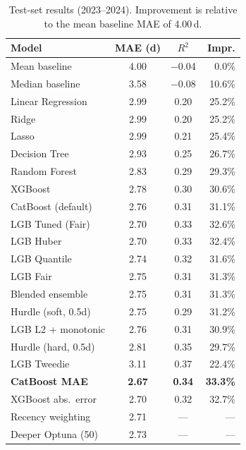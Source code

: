 \documentclass[sigconf,nonacm]{acmart}
\begin{document}
\begin{table}[t]
\caption{Test-set results (2023--2024). Improvement is relative
to the mean baseline MAE of 4.00\,d.}
\label{tab:results}
\centering
\small
\begin{tabular}{lccr}
\toprule
\textbf{Model} & \textbf{MAE (d)} & \textbf{$R^2$} &
  \textbf{Impr.} \\
\midrule
Mean baseline         & 4.00 & $-$0.04 &  0.0\% \\
Median baseline       & 3.58 & $-$0.08 & 10.6\% \\
\midrule
Linear Regression     & 2.99 &   0.20  & 25.2\% \\
Ridge                 & 2.99 &   0.20  & 25.2\% \\
Lasso                 & 2.99 &   0.21  & 25.4\% \\
Decision Tree         & 2.93 &   0.25  & 26.7\% \\
\midrule
Random Forest         & 2.83 &   0.29  & 29.3\% \\
XGBoost               & 2.78 &   0.30  & 30.6\% \\
CatBoost (default)    & 2.76 &   0.31  & 31.1\% \\
\midrule
LGB Tuned (Fair)      & 2.70 &   0.33  & 32.6\% \\
LGB Huber             & 2.70 &   0.33  & 32.4\% \\
LGB Quantile          & 2.74 &   0.32  & 31.6\% \\
LGB Fair              & 2.75 &   0.31  & 31.3\% \\
Blended ensemble      & 2.75 &   0.31  & 31.3\% \\
Hurdle (soft, 0.5d)   & 2.75 &   0.29  & 31.2\% \\
LGB L2 + monotonic    & 2.76 &   0.31  & 30.9\% \\
Hurdle (hard, 0.5d)   & 2.81 &   0.35  & 29.7\% \\
LGB Tweedie           & 3.11 &   0.37  & 22.4\% \\
\midrule
\textbf{CatBoost MAE} & \textbf{2.67} & \textbf{0.34} &
  \textbf{33.3\%} \\
XGBoost abs.\ error   & 2.70 &   0.32  & 32.7\% \\
Recency weighting     & 2.71 &   ---   & ---   \\
Deeper Optuna (50)    & 2.73 &   ---   & ---   \\
\bottomrule
\end{tabular}
\end{table}
\end{document}
